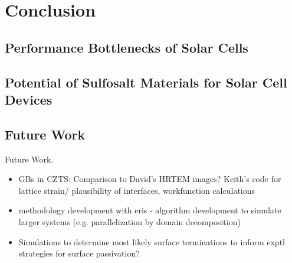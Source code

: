 
\chapter{Conclusion}

\label{ch:conclusions}

\section{Performance Bottlenecks of \CZTS Solar Cells}
\section{Potential of Sulfosalt Materials for Solar Cell Devices}

\section{Future Work}

Future Work.
\begin{itemize}
\item GBs in CZTS: Comparison to David's HRTEM images? Keith's code for lattice strain/ plausibility of interfaces, workfunction calculations
\item methodology development with eris - algorithm development to simulate larger systems (e.g. parallelization by domain decomposition)
\item Simulations to determine most likely surface terminations to inform exptl strategies for surface passivation?
\end{itemize}

 